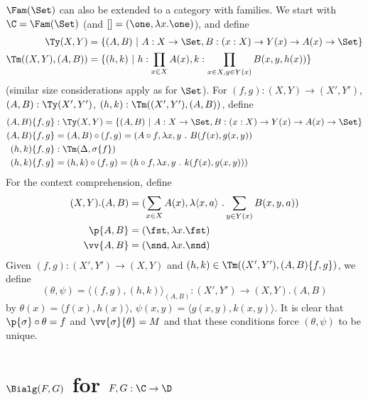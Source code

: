 \documentclass{article}
\begin{document}
$\Fam(\Set)$ can also be extended to a category with families. We
start with $\C = \Fam(\Set)$ (and $[] = (\one, \lambda x.\one)$), and define
\begin{align*}
  \Ty(X, Y) &= \{ (A, B)\ |\ A : X \to \Set, B : (x : X) \to Y(x) \to A(x) \to \Set\} \\
  \Tm((X, Y), (A, B)) &=  \{ (h, k)\ |\ h : \prod_{x \in X}A(x), k : \prod_{x \in X, y \in Y(x)}B(x, y, h(x))\}
\end{align*}
(similar size considerations apply as for $\Set$).
  For $(f, g) : (X, Y) \to (X', Y')$, $(A, B) :
\Ty(X', Y')$, $(h, k) : \Tm((X', Y'), (A, B))$, define
\begin{align*}
  (A, B)\{f, g\} &: \Ty(X, Y) = \{ (A, B)\ |\ A : X \to \Set, B : (x : X) \to Y(x) \to A(x) \to \Set\} \\
  (A, B)\{f, g\} &= (A, B) \circ (f, g) = (A \circ f, \lambda x, y\ .\ B(f(x), g(x, y)) \\
  (h, k)\{f, g\} &: \Tm(\Delta, \sigma\{f\}) \\
  (h, k)\{f, g\} &= (h, k) \circ (f, g) = (h \circ f, \lambda x, y\ .\ k(f(x), g(x, y)))
\end{align*}
For the context comprehension, define
\begin{align*}
  (X, Y).(A, B) &= (\sum_{x \in X}A(x), \lambda \langle x, a\rangle\ .\sum_{y \in Y(x)}B(x, y, a) ) \\
  \p{A, B} &= (\fst, \lambda x . \fst) \\
  \vv{A, B}&= (\snd, \lambda x . \snd)
\end{align*}
Given $(f, g) : (X', Y') \to (X, Y)$ and $(h, k) \in \Tm((X', Y'), (A, B)\{f, g\})$, we define
\[
(\theta, \psi) = \langle (f, g), (h, k)\rangle_{(A, B)} : (X', Y') \to (X, Y).(A, B)
\]
by $\theta(x) = \langle f(x), h(x)\rangle$, $\psi(x, y) = \langle g(x,
y), k(x, y)\rangle$. It is clear that $\p{\sigma} \circ \theta = f$
and $\vv{\sigma}\{\theta\} = M$ and that these conditions force
$(\theta, \psi)$ to be unique.


\section{$\Bialg(F, G)$ for $F, G : \C \to \D$}
\label{cwfDialg}
\end{document}
